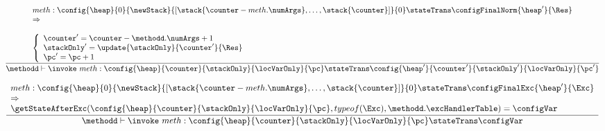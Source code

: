 \begin{itemize}
         $$ \frac{\begin{array}{l}
	                         meth : %
			                        \config{\heap}       
                                                       {0}
						       {\newStack }
                                                       {\lbrack \stack{ \counter - meth.\numArgs },\ldots ,\stack{ \counter} \rbrack }
						       {0} 
						         \stateTrans 
						\configFinalNorm{\heap'}{\Res}\\
                                                \Rightarrow  \\
			  			 \\
			\left\{\begin{array}{l}
			       \counter' = \counter - \methodd.\numArgs + 1 \\
			       \stackOnly' = \update{\stackOnly}{\counter'}{\Res} \\
			       \pc' = \pc + 1
			\end{array}\right. 
	         \end{array} 	      
	         }	         
	         {\methodd \vdash \invoke \  meth :  \config{\heap}{\counter}{\stackOnly}{\locVarOnly}{\pc} 
		                        \stateTrans  
					\config{\heap' }{\counter'}{\stackOnly' }{\locVarOnly}{\pc'}}$$
	  
	  $$ \frac{\begin{array}{l}
	                         meth: %
			                        \config{\heap}       
                                                       {0}
						       {\newStack }
                                                       {\lbrack \stack{ \counter - meth.\numArgs },\ldots ,\stack{ \counter} \rbrack }
						       {0} 
						         \stateTrans
						       \configFinalExc{\heap'}{\Exc}\\
					   \Rightarrow \\
					  \getStateAfterExc( \config{\heap}{\counter}{\stackOnly}{\locVarOnly}{\pc}, typeof(\Exc)  ,\methodd.\excHandlerTable ) =  \configVar
	         \end{array} 	      
	         }	         
	         {\methodd \vdash \invoke \  meth :  \config{\heap}{\counter}{\stackOnly}{\locVarOnly}{\pc} 
		                        \stateTrans  
					\configVar}$$



\end{itemize}
